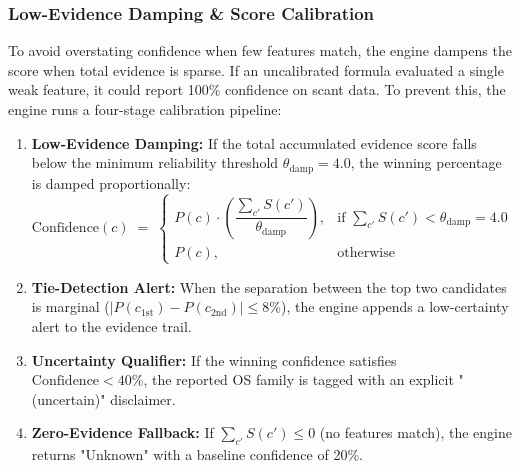 \subsubsection{Low-Evidence Damping \& Score Calibration}
To avoid overstating confidence when few features match, the engine dampens the score when total evidence
is sparse. If an uncalibrated formula evaluated a single weak feature, it could report 100\% confidence on
scant data. To prevent this, the engine runs a four-stage calibration pipeline:
\begin{enumerate}
    \item \textbf{Low-Evidence Damping:} If the total accumulated evidence score falls below the minimum
    reliability threshold $\theta_{\text{damp}} = 4.0$, the winning percentage is damped proportionally:
    \begin{equation}
    \text{Confidence}(c) \;=\; \begin{cases}
    P(c) \cdot \left(\dfrac{\sum_{c'} S(c')}{\theta_{\text{damp}}}\right), & \text{if } \sum_{c'} S(c') < \theta_{\text{damp}} = 4.0\\[8pt]
    P(c), & \text{otherwise}
    \end{cases}
    \label{eq:damping}
    \end{equation}
    \item \textbf{Tie-Detection Alert:} When the separation between the top two candidates is marginal
    ($|P(c_{\text{1st}}) - P(c_{\text{2nd}})| \le 8\%$), the engine appends a low-certainty alert to the evidence trail.
    \item \textbf{Uncertainty Qualifier:} If the winning confidence satisfies $\text{Confidence} < 40\%$,
    the reported OS family is tagged with an explicit \textsf{"(uncertain)"} disclaimer.
    \item \textbf{Zero-Evidence Fallback:} If $\sum_{c'} S(c') \le 0$ (no features match), the engine
    returns \textsf{"Unknown"} with a baseline confidence of 20\%.
\end{enumerate}

